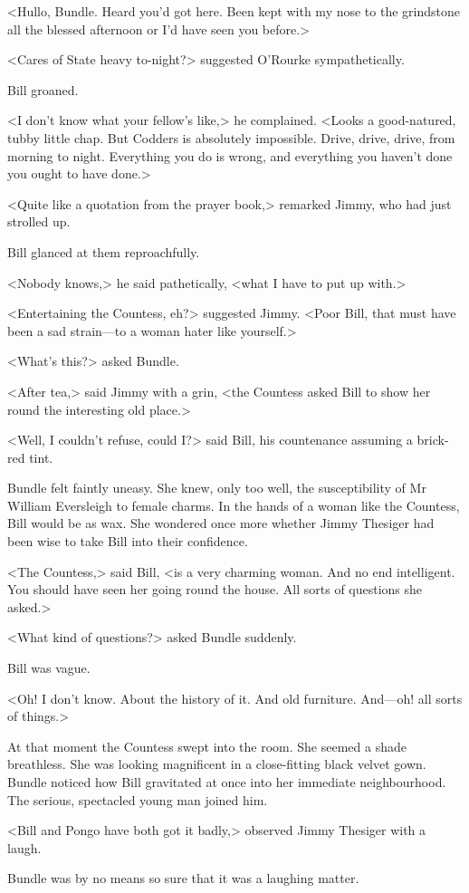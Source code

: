 <Hullo, Bundle. Heard you'd got here. Been kept with my nose to the grindstone all the blessed afternoon or I'd have seen you before.>

<Cares of State heavy to-night?> suggested O'Rourke sympathetically.

Bill groaned.

<I don't know what your fellow's like,> he complained. <Looks a good-natured, tubby little chap. But Codders is absolutely impossible. Drive, drive, drive, from morning to night. Everything you do is wrong, and everything you haven't done you ought to have done.>

<Quite like a quotation from the prayer book,> remarked Jimmy, who had just strolled up.

Bill glanced at them reproachfully.

<Nobody knows,> he said pathetically, <what I have to put up with.>

<Entertaining the Countess, eh?> suggested Jimmy. <Poor Bill, that must have been a sad strain—to a woman hater like yourself.>

<What's this?> asked Bundle.

<After tea,> said Jimmy with a grin, <the Countess asked Bill to show her round the interesting old place.>

<Well, I couldn't refuse, could I?> said Bill, his countenance assuming a brick-red tint.

Bundle felt faintly uneasy. She knew, only too well, the susceptibility of Mr William Eversleigh to female charms. In the hands of a woman like the Countess, Bill would be as wax. She wondered once more whether Jimmy Thesiger had been wise to take Bill into their confidence.

<The Countess,> said Bill, <is a very charming woman. And no end intelligent. You should have seen her going round the house. All sorts of questions she asked.>

<What kind of questions?> asked Bundle suddenly.

Bill was vague.

<Oh! I don't know. About the history of it. And old furniture. And—oh! all sorts of things.>

At that moment the Countess swept into the room. She seemed a shade breathless. She was looking magnificent in a close-fitting black velvet gown. Bundle noticed how Bill gravitated at once into her immediate neighbourhood. The serious, spectacled young man joined him.

<Bill and Pongo have both got it badly,> observed Jimmy Thesiger with a laugh.

Bundle was by no means so sure that it was a laughing matter.